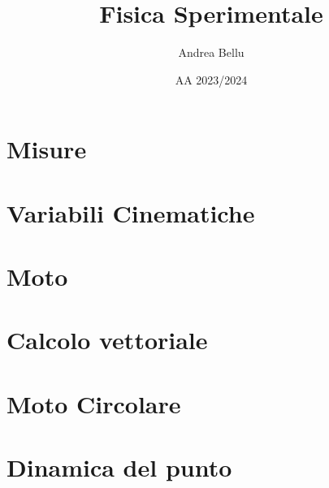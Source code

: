 \documentclass{article}
\title{Fisica Sperimentale}
\author{Andrea Bellu}
\date{AA 2023/2024}
\begin{document}
\maketitle

\tableofcontents
\newpage

\section{Misure}

\section{Variabili Cinematiche}

\section{Moto}


\section{Calcolo vettoriale}


\section{Moto Circolare}


\section{Dinamica del punto}



\end{document}
